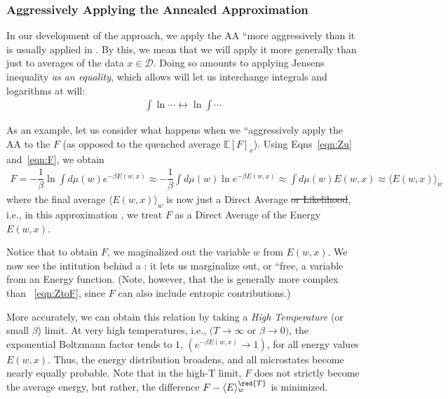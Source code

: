 
\subsubsection{Aggressively Applying the Annealed Approximation}

In our development of the \SETOL approach, we apply the AA ``more aggressively than it is usually applied in \STATMECH.
By this, we mean that we will apply it more generally than just to averages of the data $x\in\mathcal{D}$.
Doing so amounts to applying Jensens inequality \emph{as an equality}, which allows will let us interchange integrals and logarithms at will:
\begin{align}
\label{eqn:Jensens}
\int\ln\cdots \leftrightarrow \ln\int\cdots
\end{align}

\noindent
As an example, let us consider what happens when we ``aggressively apply the AA to the \FreeEnergy $F$ (as opposed to the quenched average  $\mathbb{E}[F]_{x}$).
Using Eqns~\ref{eqn:Zu} and~\ref{eqn:F}, we obtain
\begin{align}
\label{eqn:ZtoF}
F %
   =       -\dfrac{1}{\beta}\ln \int d\mu(w) e^{-\beta E(w,x)}  %
   \approx -\dfrac{1}{\beta}\int d\mu(w) \ln e^{-\beta E(w,x)}  %
   \approx \int d\mu(w) E(w,x)                                  %
   \approx \langle E(w,x)\rangle_{w}
\end{align}
where the final average $\langle E(w,x)\rangle_{w}$ is now just a Direct Average \st{or Likelihood}, i.e., 
in this approximation , we treat $F$ as a Direct Average of the Energy $E(w,x)$.

Notice that to obtain $F$, we maginalized out the variable $w$ from $E(w,x)$.
We now see the intitution behind a \FreeEnergy: it lets us marginalize out, or ``free, a variable from an Energy function.
(Note, however, that the \FreeEnergy is generally more complex than \EQN~\ref{eqn:ZtoF}, since $F$ can also include entropic contributions.)


More accurately, we can obtain this relation  by taking a \emph{High Temperature} (or small $\beta$) limit.
At very high temperatures, i.e., $( T \rightarrow \infty $ or $ \beta \rightarrow 0 )$,
the exponential Boltzmann factor tends to $1$,  $(e^{-\beta E(w,x)} \rightarrow 1)$,
for all energy values $ E(w,x)$.
Thus, the energy distribution broadens, and all microstates become nearly equally probable.
Note that in the high-T limit,
\FreeEnergy $F$ 
does not strictly become the average energy, but rather,
the difference $F -\langle E \rangle_{w}^{\red{T}} $ is minimized.

